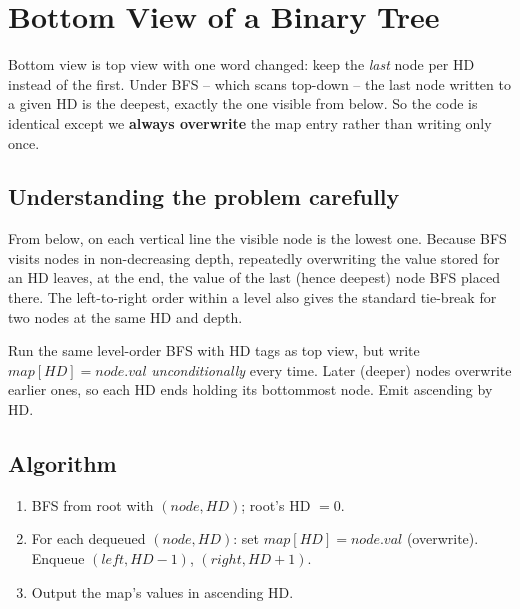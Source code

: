 \section{Bottom View of a Binary Tree}
\label{sec:trees-bottom-view}


\begin{patternbox}
Bottom view is top view with one word changed: keep the \emph{last} node
per HD instead of the first. Under BFS -- which scans top-down -- the last
node written to a given HD is the deepest, exactly the one visible from
below. So the code is identical except we \textbf{always overwrite} the
map entry rather than writing only once.
\end{patternbox}

\subsection*{Understanding the problem carefully}

From below, on each vertical line the visible node is the lowest one.
Because BFS visits nodes in non-decreasing depth, repeatedly overwriting
the value stored for an HD leaves, at the end, the value of the last (hence
deepest) node BFS placed there. The left-to-right order within a level
also gives the standard tie-break for two nodes at the same HD and depth.

\begin{ideabox}
Run the same level-order BFS with HD tags as top view, but write
$\textit{map}[HD]=node.val$ \emph{unconditionally} every time. Later
(deeper) nodes overwrite earlier ones, so each HD ends holding its
bottommost node. Emit ascending by HD.
\end{ideabox}

\subsection*{Algorithm}

\begin{enumerate}
  \item BFS from root with $(node, HD)$; root's HD $=0$.
  \item For each dequeued $(node, HD)$: set $\textit{map}[HD]=node.val$
        (overwrite). Enqueue $(left, HD-1)$, $(right, HD+1)$.
  \item Output the map's values in ascending HD.
\end{enumerate}

